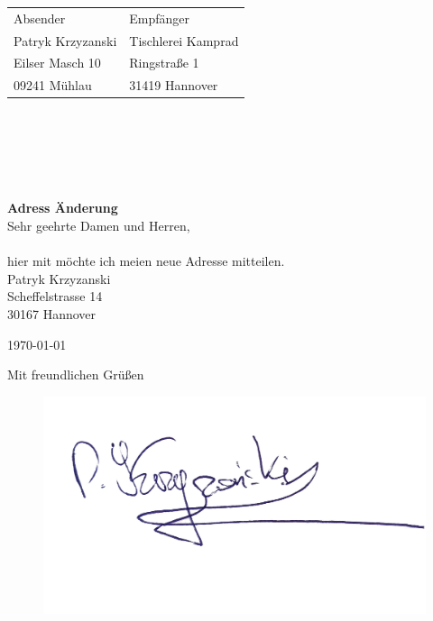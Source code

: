 \documentclass{letter}
\begin{document}
\begin{letter}{}
\begin{tabular}{@{}p{3.0in}l}

Absender  			& Empfänger\\
Patryk Krzyzanski  		& Tischlerei Kamprad\\
Eilser Masch 10			& Ringstraße 1\\
09241 Mühlau			& 31419 Hannover\\
\end{tabular}\\ \\ \\ \\
\bigskip
\\
\Large\textbf{Adress Änderung}\\
\bigskip
\normalsize
Sehr geehrte Damen und Herren, \\\\

hier mit möchte ich meien neue Adresse mitteilen. 
\\

Patryk Krzyzanski\\
Scheffelstrasse 14\\
30167 Hannover\\
\bigskip

\today
 
\closing{Mit freundlichen Grüßen}
\begin{figure}
  \includegraphics[width=0.5\linewidth]{podpis.jpg}
\end{figure}



\end{letter}
\end{document}

